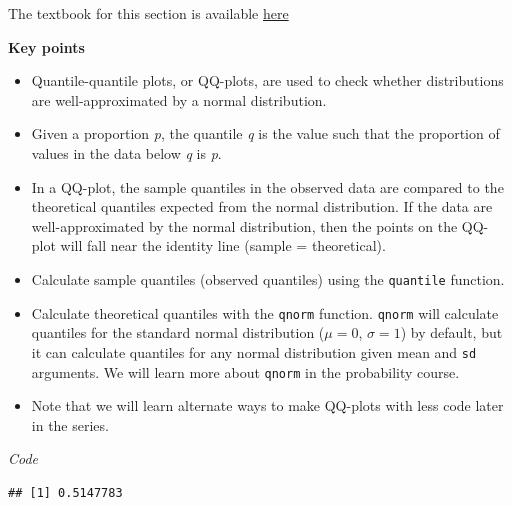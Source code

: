 \documentclass[
]{article}
\newenvironment{Shaded}{\begin{snugshade}}{\end{snugshade}}
\newcommand{\CommentTok}[1]{\textcolor[rgb]{0.56,0.35,0.01}{\textit{#1}}}
\newcommand{\FloatTok}[1]{\textcolor[rgb]{0.00,0.00,0.81}{#1}}
\newcommand{\KeywordTok}[1]{\textcolor[rgb]{0.13,0.29,0.53}{\textbf{#1}}}
\newcommand{\NormalTok}[1]{#1}
\newcommand{\OperatorTok}[1]{\textcolor[rgb]{0.81,0.36,0.00}{\textbf{#1}}}
\newcommand{\StringTok}[1]{\textcolor[rgb]{0.31,0.60,0.02}{#1}}
\providecommand{\tightlist}{%
  \setlength{\itemsep}{0pt}\setlength{\parskip}{0pt}}
\begin{document}
The textbook for this section is available
\href{https://rafalab.github.io/dsbook/distributions.html\#quantile-quantile-plots}{here}

\textbf{Key points}

\begin{itemize}
\tightlist
\item
  Quantile-quantile plots, or QQ-plots, are used to check whether
  distributions are well-approximated by a normal distribution.
\item
  Given a proportion \emph{p}, the quantile \emph{q} is the value such
  that the proportion of values in the data below \emph{q} is \emph{p}.
\item
  In a QQ-plot, the sample quantiles in the observed data are compared
  to the theoretical quantiles expected from the normal distribution. If
  the data are well-approximated by the normal distribution, then the
  points on the QQ-plot will fall near the identity line (sample =
  theoretical).
\item
  Calculate sample quantiles (observed quantiles) using the
  \texttt{quantile} function.
\item
  Calculate theoretical quantiles with the \texttt{qnorm} function.
  \texttt{qnorm} will calculate quantiles for the standard normal
  distribution (\(\mu = 0\), \(\sigma = 1\)) by default, but it can
  calculate quantiles for any normal distribution given mean and
  \texttt{sd} arguments. We will learn more about \texttt{qnorm} in the
  probability course.
\item
  Note that we will learn alternate ways to make QQ-plots with less code
  later in the series.
\end{itemize}

\emph{Code}

\begin{Shaded}
\end{Shaded}

\begin{verbatim}
## [1] 0.5147783
\end{verbatim}
\end{document}
